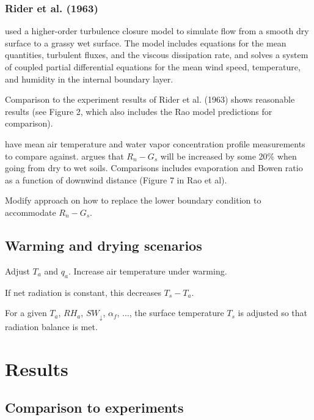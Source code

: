 \documentclass{article}
\begin{document}
    
    \subsubsection*{Rider et al. (1963)} \citet{rao1974local} used a higher-order turbulence closure model to simulate flow from a smooth dry surface to a grassy wet surface. The model includes equations for the mean quantities, turbulent fluxes, and the viscous dissipation rate, and solves a system of coupled partial differential equations for the mean wind speed, temperature, and humidity in the internal boundary layer.
    
    Comparison to the experiment results of Rider et al. (1963) shows reasonable results
    (see Figure 2, which also includes the Rao model predictions for comparison).
    
    \citet{rider1963horizontal} have mean air temperature and water vapor concentration profile measurements to compare against. \citet{rao1974local} argues that $R_n - G_s$ will be increased by some 20\% when going from dry to wet soils. Comparisons includes evaporation and Bowen ratio as a function of downwind distance  (Figure 7 in Rao et al).
    
    Modify approach on how to replace the lower boundary condition to accommodate $R_n-G_s$.  
    
    \subsection{Warming and drying scenarios} 
    
    Adjust $T_a$ and $q_a$.     
    Increase air temperature under warming.
    
    If net radiation is constant, this decreases $T_s - T_a$. 
    
    For a given $T_a$, $RH_a$, $SW_{\downarrow}$, $\alpha_f$, ..., 
    the surface temperature $T_s$ is adjusted so that radiation balance is met.
    
    \section{Results}

    
    \subsection{Comparison to experiments}
    
    
    
\end{document}
